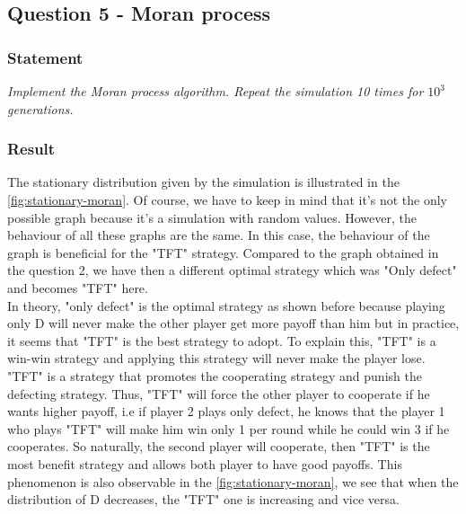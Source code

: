 \documentclass{article}
\begin{document}
\subsection{Question 5 - Moran process}

\subsubsection*{Statement}
\textit{Implement the Moran process algorithm. Repeat the simulation 10 times for $10^{3}$ generations.}

\subsubsection{Result}
The stationary distribution given by the simulation is illustrated in the \autoref{fig:stationary-moran}. Of course, we have to keep in mind that it's not the only possible graph because it's a simulation with random values. However, the behaviour of all these graphs are the same. In this case, the behaviour of the graph is beneficial for the "TFT" strategy. Compared to the graph obtained in the question 2, we have then a different optimal strategy which was "Only defect" and becomes "TFT" here. \\

In theory, "only defect" is the optimal strategy as shown before because playing only D will never make the other player get more payoff than him but in practice, it seems that "TFT" is the best strategy to adopt. To explain this, "TFT" is a win-win strategy and applying this strategy will never make the player lose. "TFT" is a strategy that promotes the cooperating strategy and punish the defecting strategy. Thus, "TFT" will force the other player to cooperate if he wants higher payoff, i.e if player 2 plays only defect, he knows that the player 1 who plays "TFT" will make him win only 1 per round while he could win 3 if he cooperates. So naturally, the second player will cooperate, then "TFT" is the most benefit strategy and allows both player to have good payoffs. This phenomenon is also observable in the \autoref{fig:stationary-moran}, we see that when the distribution of D decreases, the "TFT" one is increasing and vice versa. 
\end{document}
